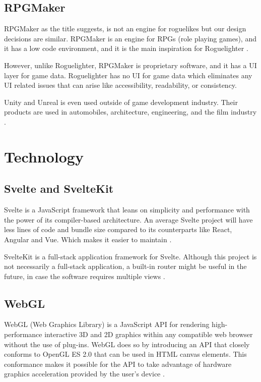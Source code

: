 \documentclass{article}
\begin{document}
\subsection{RPGMaker}
RPGMaker as the title suggests, is not an engine for roguelikes but our design decisions are similar. RPGMaker is an engine for RPGs (role playing games), and it has a low code environment, and it is the main inspiration for Roguelighter \cite{rpgmaker}.  

However, unlike Roguelighter, RPGMaker is proprietary software, and it has a UI layer for game data. Roguelighter has no UI for game data which eliminates any UI related issues that can arise like accessibility, readability, or consistency. 
 
Unity and Unreal is even used outside of game development industry. Their products are used in automobiles, architecture, engineering, and the film industry \cite{unity}\cite{unity-industry}\cite{unreal}.

\section{Technology}
\subsection{Svelte and SvelteKit}
Svelte is a JavaScript framework that leans on simplicity and performance with the power of its compiler-based architecture. An average Svelte project will have less lines of code and bundle size compared to its counterparts like React, Angular and Vue. Which makes it easier to maintain \cite{svelte-less}.

SvelteKit is a full-stack application framework for Svelte. Although this project is not necessarily a full-stack application, a built-in router might be useful in the future, in case the software requires multiple views \cite{sveltekit}.

\subsection{WebGL}
WebGL (Web Graphics Library) is a JavaScript API for rendering high-performance interactive 3D and 2D graphics within any compatible web browser without the use of plug-ins. WebGL does so by introducing an API that closely conforms to OpenGL ES 2.0 that can be used in HTML canvas elements. This conformance makes it possible for the API to take advantage of hardware graphics acceleration provided by the user's device \cite{webgl}. 
\end{document}
